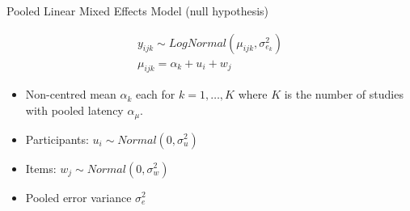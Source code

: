 \begin{frame}[fragile]{Pooled Linear Mixed Effects Model (null hypothesis)}
	
		\begin{equation*}
			\begin{aligned}	
				y_{ijk} \sim LogNormal(\mu_{ijk}, \sigma_{e_k}^2) \\
				\mu_{ijk} = \alpha_k + u_i + w_j
			\end{aligned}
		\end{equation*}
		\begin{small}	
			\begin{itemize}
				\item Non-centred mean $\alpha_k$ each for $k = 1, \dots, K$ where $K$ is the number of studies \parencite{gelman2014} with pooled latency $\alpha_{\mu}$.
				
				\item Participants: $u_i \sim Normal(0, \sigma_u^2)$
				\item Items: $w_j \sim Normal(0, \sigma_w^2)$

				\item Pooled error variance $\sigma_e^2$
			\end{itemize}
		\end{small}
\end{frame}


